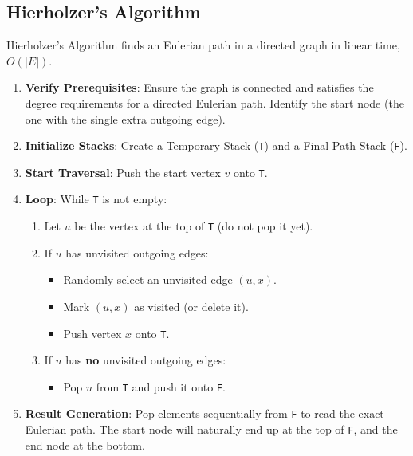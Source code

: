 \documentclass[11pt,a4paper]{article}
\begin{document}
\subsection{Hierholzer's Algorithm}
Hierholzer's Algorithm finds an Eulerian path in a directed graph in linear time, $O(|E|)$.

\begin{enumerate}
    \item \textbf{Verify Prerequisites}: Ensure the graph is connected and satisfies the degree requirements for a directed Eulerian path. Identify the start node (the one with the single extra outgoing edge).
    \item \textbf{Initialize Stacks}: Create a Temporary Stack (\texttt{T}) and a Final Path Stack (\texttt{F}).
    \item \textbf{Start Traversal}: Push the start vertex $v$ onto \texttt{T}.
    \item \textbf{Loop}: While \texttt{T} is not empty:
    \begin{enumerate}
        \item Let $u$ be the vertex at the top of \texttt{T} (do not pop it yet).
        \item If $u$ has unvisited outgoing edges:
        \begin{itemize}
            \item Randomly select an unvisited edge $(u, x)$.
            \item Mark $(u, x)$ as visited (or delete it).
            \item Push vertex $x$ onto \texttt{T}.
        \end{itemize}
        \item If $u$ has \textbf{no} unvisited outgoing edges:
        \begin{itemize}
            \item Pop $u$ from \texttt{T} and push it onto \texttt{F}.
        \end{itemize}
    \end{enumerate}
    \item \textbf{Result Generation}: Pop elements sequentially from \texttt{F} to read the exact Eulerian path. The start node will naturally end up at the top of \texttt{F}, and the end node at the bottom.
\end{enumerate}

\end{document}
